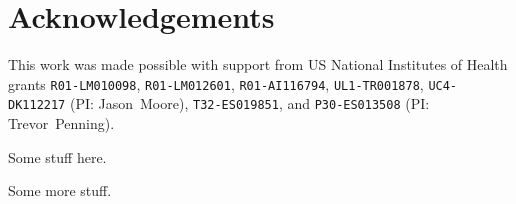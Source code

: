 \documentclass{ws-procs11x85}
\begin{document}
\section*{Acknowledgements}
This work was made possible with support from US National Institutes of Health grants \texttt{R01-LM010098}, \texttt{R01-LM012601}, \texttt{R01-AI116794}, \texttt{UL1-TR001878}, \texttt{UC4-DK112217} (PI: Jason~Moore), \texttt{T32-ES019851}, and \texttt{P30-ES013508} (PI: Trevor~Penning).




Some stuff here.

Some more stuff.
\end{document}

